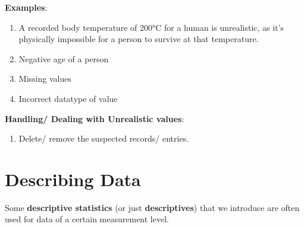\vspace{0.3cm}

\textbf{Examples}:
\begin{enumerate}
    \item A recorded body temperature of 200°C for a human is unrealistic, as it’s physically impossible for a person to survive at that temperature. \cite{common/online/chatgpt}

    \item Negative age of a person \cite{common/online/chatgpt}

    \item Missing values \cite{statistics/book/Statistics-for-Data-Scientists/Maurits-Kaptein}

    \item Incorrect datatype of value \cite{statistics/book/Statistics-for-Data-Scientists/Maurits-Kaptein}
\end{enumerate}

\vspace{0.3cm}
\textbf{Handling/ Dealing with Unrealistic values}:
\begin{enumerate}
    \item Delete/ remove the suspected records/ entries. \cite{statistics/book/Statistics-for-Data-Scientists/Maurits-Kaptein}
    
\end{enumerate}





\section{Describing Data \cite{statistics/book/Statistics-for-Data-Scientists/Maurits-Kaptein}} \label{Data/Describing Data}

Some \textbf{descriptive statistics}\label{Data/Describing Data/descriptive statistics} (or just \textbf{descriptives}\label{Data/Describing Data/descriptives}) that we introduce are often used for data of a certain measurement level. \cite{statistics/book/Statistics-for-Data-Scientists/Maurits-Kaptein}








